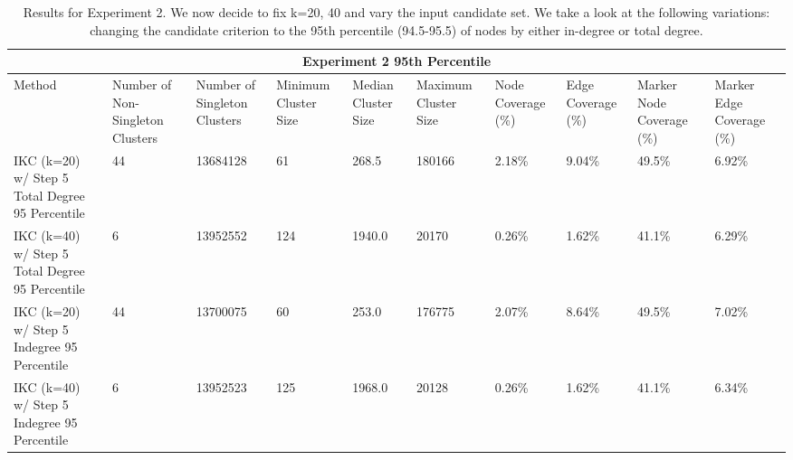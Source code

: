 \documentclass{article}
\begin{document}
\begin{table}[h!]
	\centering
	\begin{small}
		\begin{tabular}{ |p{0.95cm}||p{1.25cm}|p{1.25cm}||p{1.20cm}|p{1.20cm}|p{1.20cm}||p{1.25cm}|p{1.25cm}|| p{1.25cm}|p{1.25cm}| }
			\hline
			\multicolumn{10}{|c|}{Experiment 2 95th Percentile} \\
			\hline
			Method & Number of Non-Singleton Clusters & Number of Singleton Clusters & Minimum Cluster Size &  Median Cluster Size & Maximum Cluster Size & Node Coverage (\%)& Edge Coverage  (\%)& Marker Node Coverage  (\%)& Marker Edge Coverage  (\%)\\
			\hline
			IKC (k=20)  w/ Step 5 Total Degree 95 Percentile &  44    & \cellcolor{blue!20}13684128 &   61 & \cellcolor{blue!20}268.5 & \cellcolor{blue!20}180166 & \cellcolor{red!20}2.18\% & \cellcolor{blue!20}9.04\% & \cellcolor{blue!20}49.5\% & \cellcolor{blue!20}6.92\% \\ \hline
			
			IKC (k=40)  w/ Step 5 Total Degree 95 Percentile  &  6    & \cellcolor{red!20}13952552 &   \cellcolor{blue!20}124 & \cellcolor{blue!20}1940.0 & \cellcolor{blue!20}20170 & \cellcolor{blue!20}0.26\% & \cellcolor{blue!20}1.62\% & \cellcolor{blue!20}41.1\% & \cellcolor{blue!20}6.29\% \\ \hline
			\hline
			IKC (k=20)  w/ Step 5 Indegree 95 Percentile &  44    & \cellcolor{blue!20}13700075 &   \cellcolor{blue!20}60 & \cellcolor{blue!20}253.0 & \cellcolor{blue!20}176775 & \cellcolor{red!20}2.07\% & \cellcolor{blue!20}8.64\% & \cellcolor{blue!20}49.5\% & \cellcolor{blue!20}7.02\% \\ \hline
			
			IKC (k=40)  w/ Step 5 Indegree 95 Percentile  &  6    &\cellcolor{red!20}13952523 &   \cellcolor{blue!20}125 & \cellcolor{blue!20}1968.0 & \cellcolor{blue!20}20128 & \cellcolor{blue!20}0.26\% & \cellcolor{blue!20}1.62\% &\cellcolor{blue!20}41.1\% & \cellcolor{blue!20}6.34\% \\ \hline
			\hline
		\end{tabular}
	\end{small}
	\caption{Results for Experiment 2. We now decide to fix k=20, 40 and vary the input candidate set. We take a look at the following variations:  changing the candidate criterion to the 95th percentile (94.5-95.5) of nodes by either in-degree or total degree. }
	\label{table:expt2}
\end{table}
			 
\end{document}
